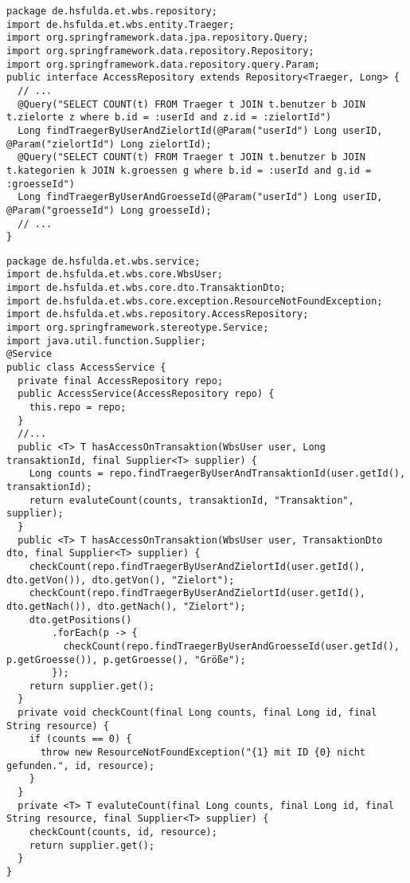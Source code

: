 \begin{lstlisting}[caption={Repository im Stil von \textit{Spring Boot Data} für die Zugriffsprüfung.}, label={lst:AccessRepository}]
package de.hsfulda.et.wbs.repository;
import de.hsfulda.et.wbs.entity.Traeger;
import org.springframework.data.jpa.repository.Query;
import org.springframework.data.repository.Repository;
import org.springframework.data.repository.query.Param;
public interface AccessRepository extends Repository<Traeger, Long> {
  // ...
  @Query("SELECT COUNT(t) FROM Traeger t JOIN t.benutzer b JOIN t.zielorte z where b.id = :userId and z.id = :zielortId")
  Long findTraegerByUserAndZielortId(@Param("userId") Long userID, @Param("zielortId") Long zielortId);
  @Query("SELECT COUNT(t) FROM Traeger t JOIN t.benutzer b JOIN t.kategorien k JOIN k.groessen g where b.id = :userId and g.id = :groesseId")
  Long findTraegerByUserAndGroesseId(@Param("userId") Long userID, @Param("groesseId") Long groesseId);
  // ...
}
\end{lstlisting}

\begin{lstlisting}[caption={Serviceklasse für die Zugriffsprüfung.}, label={lst:AccessService}]
package de.hsfulda.et.wbs.service;
import de.hsfulda.et.wbs.core.WbsUser;
import de.hsfulda.et.wbs.core.dto.TransaktionDto;
import de.hsfulda.et.wbs.core.exception.ResourceNotFoundException;
import de.hsfulda.et.wbs.repository.AccessRepository;
import org.springframework.stereotype.Service;
import java.util.function.Supplier;
@Service
public class AccessService {
  private final AccessRepository repo;
  public AccessService(AccessRepository repo) {
    this.repo = repo;
  }
  //...
  public <T> T hasAccessOnTransaktion(WbsUser user, Long transaktionId, final Supplier<T> supplier) {
    Long counts = repo.findTraegerByUserAndTransaktionId(user.getId(), transaktionId);
    return evaluteCount(counts, transaktionId, "Transaktion", supplier);
  }
  public <T> T hasAccessOnTransaktion(WbsUser user, TransaktionDto dto, final Supplier<T> supplier) {
    checkCount(repo.findTraegerByUserAndZielortId(user.getId(), dto.getVon()), dto.getVon(), "Zielort");
    checkCount(repo.findTraegerByUserAndZielortId(user.getId(), dto.getNach()), dto.getNach(), "Zielort");
    dto.getPositions()
        .forEach(p -> {
          checkCount(repo.findTraegerByUserAndGroesseId(user.getId(), p.getGroesse()), p.getGroesse(), "Größe");
        });
    return supplier.get();
  }
  private void checkCount(final Long counts, final Long id, final String resource) {
    if (counts == 0) {
      throw new ResourceNotFoundException("{1} mit ID {0} nicht gefunden.", id, resource);
    }
  }
  private <T> T evaluteCount(final Long counts, final Long id, final String resource, final Supplier<T> supplier) {
    checkCount(counts, id, resource);
    return supplier.get();
  }
}
\end{lstlisting}

